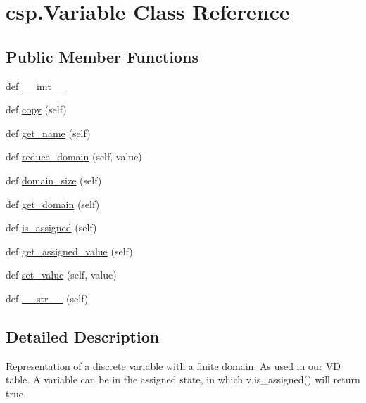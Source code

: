 \hypertarget{classcsp_1_1_variable}{}\section{csp.\+Variable Class Reference}
\label{classcsp_1_1_variable}
\subsection*{Public Member Functions}
\begin{DoxyCompactItemize}
\item 
def \hyperlink{classcsp_1_1_variable_a7685b41564c677a4ddbab211579a1339}{\+\_\+\+\_\+init\+\_\+\+\_\+}
\item 
def \hyperlink{classcsp_1_1_variable_ae371ddad32c43bbc88cc4c233ae6ecb4}{copy} (self)
\item 
def \hyperlink{classcsp_1_1_variable_a33495db904272dfd02ec8f54878917d6}{get\+\_\+name} (self)
\item 
def \hyperlink{classcsp_1_1_variable_a90da3230e8fc8e7ff5656b1b23e67e3b}{reduce\+\_\+domain} (self, value)
\item 
def \hyperlink{classcsp_1_1_variable_a332b843f4139358f0c8256c3bcebd94a}{domain\+\_\+size} (self)
\item 
def \hyperlink{classcsp_1_1_variable_aafcf7323210788aebc98c1601bfd7b9f}{get\+\_\+domain} (self)
\item 
def \hyperlink{classcsp_1_1_variable_ab6415aa5347d1764b54d3ccbc5682d92}{is\+\_\+assigned} (self)
\item 
def \hyperlink{classcsp_1_1_variable_a82f9e4bbfd0d8ee1bc02a8f28de0b5de}{get\+\_\+assigned\+\_\+value} (self)
\item 
def \hyperlink{classcsp_1_1_variable_ad42362de592cfbf507a1f12fd908752a}{set\+\_\+value} (self, value)
\item 
def \hyperlink{classcsp_1_1_variable_a070e4abdeaedb1fadc5e780a10c258bd}{\+\_\+\+\_\+str\+\_\+\+\_\+} (self)
\end{DoxyCompactItemize}


\subsection{Detailed Description}
\begin{DoxyVerb}Representation of a discrete variable with a finite domain.
As used in our VD table.
A variable can be in the assigned state, in which v.is_assigned()
will return true.
\end{DoxyVerb}
 


